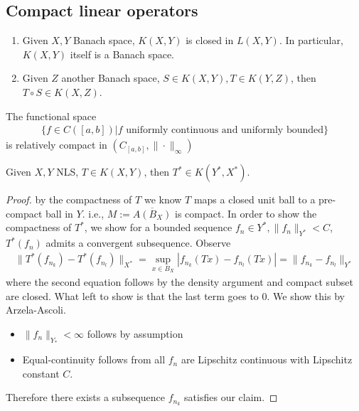 \subsection{Compact linear operators}

\begin{theorem}\quad
\begin{enumerate}
	\item 	Given $X, Y$ Banach space, $K(X,Y)$ is closed in $L(X,Y)$. In particular, $K(X,Y)$ itself is a Banach space.
	\item Given $Z$ another Banach space, $S\in K(X, Y), T\in K(Y, Z)$, then $T \circ S \in K(X, Z)$. 
\end{enumerate}
\end{theorem}

\begin{theorem}
 The functional space
 \begin{align*}
 	\bigg\{f \in C([a, b]) | f \text{ uniformly continuous and uniformly bounded} \bigg\}
 \end{align*} 
 is relatively compact in $(C_{[a, b]}, \|\cdot\|_\infty)$ 
 \end{theorem}
 
 \begin{theorem}
	Given $X, Y$ NLS, $T \in K(X, Y)$, then $T^* \in K(Y^*, X^*)$.
\end{theorem}
\begin{proof}
	by the compactness of $T$ we know $T$ maps a closed unit ball to a pre-compact ball in $Y$. i.e., $M:= \overline{A(B_X)}$ is compact. In order to show the compactness of $T^*$, we show for a  bounded sequence $f_n \in Y^*, \|f_n\|_{Y^*}< C$, $T^*(f_n)$ admits a convergent subsequence. Observe 
	\begin{align*}
		\|T^*(f_{n_k}) - T^*(f_{n_l})\|_{X^*} = \sup_{x \in B_X} |f_{n_k}(Tx) - f_{n_l}(Tx)| = \|f_{n_k} - f_{n_l}\|_{Y^*}
	\end{align*}
	where the second equation follows by the density argument and compact subset are closed. What left to show is that the last term goes to 0. We show this by Arzela-Ascoli.
	\begin{itemize}
		\item $\|f_n\|_{Y_*}< \infty$ follows by assumption
		\item Equal-continuity follows from all $f_n$ are Lipschitz continuous with Lipschitz constant $C$.
	\end{itemize}
	Therefore there exists a subsequence $f_{n_k}$ satisfies our claim.
\end{proof}

